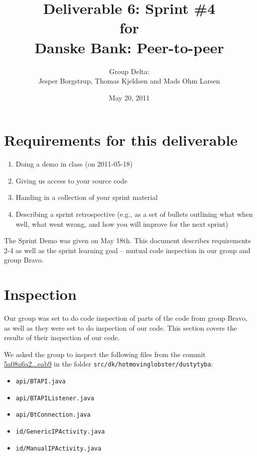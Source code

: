 \documentclass[a4paper,11pt]{article}
\title{Deliverable 6: Sprint \#4\\\small{for}\\\small{Danske Bank: Peer-to-peer}}
\author{ Group Delta:\\Jesper Borgstrup, Thomas Kjeldsen and Mads Ohm Larsen }
\date{May 20, 2011}
\begin{document}
\ifpdf
{}
\else
{}
\fi

\maketitle



\section{Requirements for this deliverable}
\begin{enumerate}
\item Doing a demo in class (on 2011-05-18)
\item Giving us access to your source code
\item Handing in a collection of your sprint material
\item Describing a sprint retrospective (e.g., as a set of bullets outlining what
when well, what went wrong, and how you will improve for the next sprint)
\end{enumerate}

The Sprint Demo was given on May 18th. This document describes requirements 2-4 as well as the sprint learning goal -- mutual code inspection in our group and group Bravo.


\section{Inspection}
Our group was set to do code inspection of parts of the code from group Bravo, as well as they were set to do inspection of our code. This section covers the results of their inspection of our code.

We asked the group to inspect the following files from the commit \href{https://github.com/omegahm/DBP2P/commit/5a08a6a2c3a4d11663ae10a8ee2b371f69f2eab9}{5a08a6a2...eab9} in the folder {\tt src/dk/hotmovinglobster/dustytyba}:

\begin{itemize}
\item {\tt api/BTAPI.java}
\item {\tt api/BTAPIListener.java}
\item {\tt api/BtConnection.java}
\item {\tt id/GenericIPActivity.java}
\item {\tt id/ManualIPActivity.java}
\end{itemize}
\end{document}
